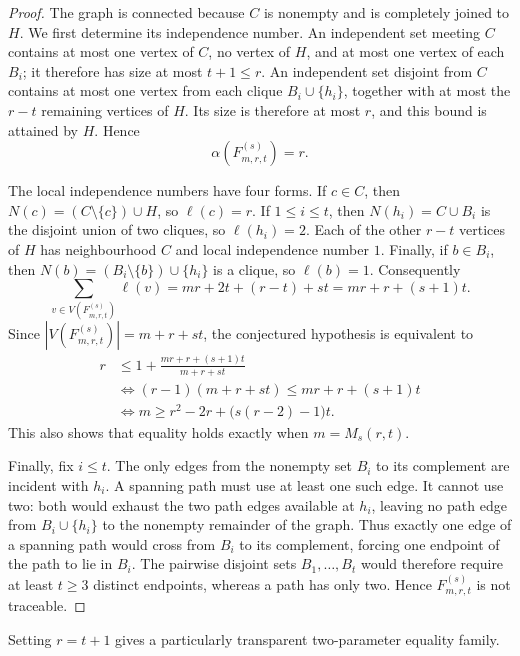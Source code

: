 \documentclass[11pt]{article}
\begin{document}
\begin{proof}
The graph is connected because $C$ is nonempty and is completely joined to $H$.
We first determine its independence number.  An independent set meeting $C$ contains
at most one vertex of $C$, no vertex of $H$, and at most one vertex of each $B_i$; it
therefore has size at most $t+1\leq r$.  An independent set disjoint from $C$ contains at
most one vertex from each clique $B_i\cup\{h_i\}$, together with at most the $r-t$
remaining vertices of $H$.  Its size is therefore at most $r$, and this bound is attained
by $H$.  Hence
\[
  \alpha(F^{(s)}_{m,r,t})=r.
\]

The local independence numbers have four forms.  If $c\in C$, then
$N(c)=(C\setminus\{c\})\cup H$, so $\ell(c)=r$.  If $1\leq i\leq t$, then
$N(h_i)=C\cup B_i$ is the disjoint union of two cliques, so $\ell(h_i)=2$.  Each of the
other $r-t$ vertices of $H$ has neighbourhood $C$ and local independence number $1$.
Finally, if $b\in B_i$, then $N(b)=(B_i\setminus\{b\})\cup\{h_i\}$ is a clique, so
$\ell(b)=1$.  Consequently
\begin{equation}\label{eq:localsum}
  \sum_{v\in V(F^{(s)}_{m,r,t})}\ell(v)
  =mr+2t+(r-t)+st
  =mr+r+(s+1)t.
\end{equation}
Since $|V(F^{(s)}_{m,r,t})|=m+r+st$, the conjectured hypothesis is equivalent to
\begin{align*}
  r
  &\leq 1+\frac{mr+r+(s+1)t}{m+r+st}\\
  &\Longleftrightarrow
  (r-1)(m+r+st)\leq mr+r+(s+1)t\\
  &\Longleftrightarrow
  m\geq r^2-2r+\bigl(s(r-2)-1\bigr)t.
\end{align*}
This also shows that equality holds exactly when $m=M_s(r,t)$.

Finally, fix $i\leq t$.  The only edges from the nonempty set $B_i$ to its complement are
incident with $h_i$.  A spanning path must use at least one such edge.  It cannot use two:
both would exhaust the two path edges available at $h_i$, leaving no path edge from
$B_i\cup\{h_i\}$ to the nonempty remainder of the graph.  Thus exactly one edge of a
spanning path would cross from $B_i$ to its complement, forcing one endpoint of the path
to lie in $B_i$.  The pairwise disjoint sets $B_1,\dots,B_t$ would therefore require at
least $t\geq 3$ distinct endpoints, whereas a path has only two.  Hence
$F^{(s)}_{m,r,t}$ is not traceable.
\end{proof}

Setting $r=t+1$ gives a particularly transparent two-parameter equality family.
\end{document}
